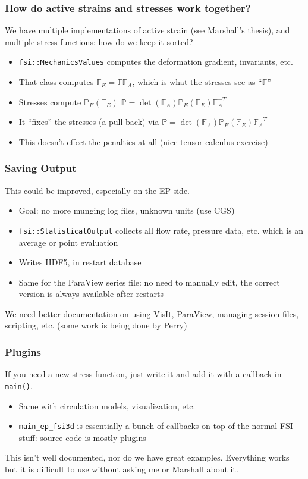 \documentclass[8pt]{beamer}
\begin{document}
\begin{frame}
  \frametitle{How do active strains and stresses work together?}
  We have multiple implementations of active strain (see Marshall's thesis),
  and multiple stress functions: how do we keep it sorted?
  \begin{itemize}
  \item[$\blacksquare$] \texttt{fsi::MechanicsValues} computes the deformation gradient,
    invariants, etc.
  \item[$\blacksquare$] That class computes $\mathbb{F}_E = \mathbb{F} \mathbb{F}_A$, which is
    what the stresses see as ``$\mathbb{F}$''
  \item[$\blacksquare$] Stresses compute $\mathbb{P}_E(\mathbb{F}_E)$
    $\mathbb{P} = \det(\mathbb{F}_A) \mathbb{P}_E(\mathbb{F}_E) \mathbb{F}_A^{-T}$
  \item[$\blacksquare$] It ``fixes'' the stresses (a pull-back) via
    $\mathbb{P} = \det(\mathbb{F}_A) \mathbb{P}_E(\mathbb{F}_E) \mathbb{F}_A^{-T}$
  \item[$\blacksquare$] This doesn't effect the penalties at all (nice tensor calculus exercise)
  \end{itemize}
\end{frame}

\begin{frame}
  \frametitle{Saving Output}
  This could be improved, especially on the EP side.
  \begin{itemize}
    \item[$\blacksquare$] Goal: no more munging log files, unknown units (use CGS)
    \item[$\blacksquare$] \texttt{fsi::StatisticalOutput} collects all flow rate, pressure data,
      etc. which is an average or point evaluation
    \item[$\blacksquare$] Writes HDF5, in restart database
    \item[$\blacksquare$] Same for the ParaView series file: no need to manually edit, the
      correct version is always available after restarts
  \end{itemize}

  \vfill
  We need better documentation on using VisIt, ParaView, managing session files,
  scripting, etc. (some work is being done by Perry)
\end{frame}

\begin{frame}
  \frametitle{Plugins}
  If you need a new stress function, just write it and add it with a callback in
  \texttt{main()}.
  \begin{itemize}
    \item[$\blacksquare$] Same with circulation models, visualization, etc.
    \item[$\blacksquare$] \texttt{main\_ep\_fsi3d} is essentially a bunch of callbacks on top of
      the normal FSI stuff: source code is mostly plugins
  \end{itemize}

  \vfill
  This isn't well documented, nor do we have great examples. Everything works but it
  is difficult to use without asking me or Marshall about it.
\end{frame}
\end{document}
